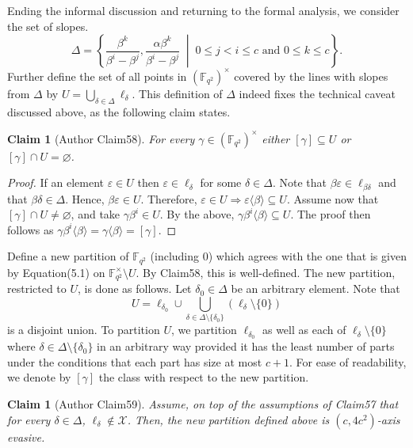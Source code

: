 \documentclass[10pt,a4paper]{article}
\newtheorem{ntclaim}[nttheorem]{Claim}
\begin{document}
Ending the informal discussion and returning to the formal analysis, we consider the set of slopes.
\begin{equation}\Delta=\left\{\frac{\beta^k}{\beta^i-\beta^j},\frac{\alpha\beta^k}{\beta^i-\beta^j}\;\middle|\;0\leq j<i\leq c\text{ and }0\leq k\leq c\right\}.\tag{5.4}\end{equation}
Further define the set of all points in $(\mathbb F_{q^2})^\times$ covered by the lines with slopes from $\Delta$ by $U=\bigcup_{\delta\in\Delta}\ell_\delta$. This definition of $\Delta$ indeed fixes the technical caveat discussed above, as the following claim states.
\begin{ntclaim}[Author Claim58]
For every $\gamma\in(\mathbb F_{q^2})^\times$ either $[\gamma]\subseteq U$ or $[\gamma]\cap U=\varnothing$.
\end{ntclaim}
\begin{proof}
If an element $\varepsilon\in U$ then $\varepsilon\in\ell_\delta$ for some $\delta\in\Delta$. Note that $\beta\varepsilon\in\ell_{\beta\delta}$ and that $\beta\delta\in\Delta$. Hence, $\beta\varepsilon\in U$. Therefore, $\varepsilon\in U\Longrightarrow\varepsilon\langle\beta\rangle\subseteq U$. Assume now that $[\gamma]\cap U\ne\varnothing$, and take $\gamma\beta^i\in U$. By the above, $\gamma\beta^i\langle\beta\rangle\subseteq U$. The proof then follows as $\gamma\beta^i\langle\beta\rangle=\gamma\langle\beta\rangle=[\gamma]$.
\end{proof}
Define a new partition of $\mathbb F_{q^2}$ (including $0$) which agrees with the one that is given by Equation(5.1) on $\mathbb F_{q^2}^\times\setminus U$. By Claim58, this is well-defined. The new partition, restricted to $U$, is done as follows. Let $\delta_0\in\Delta$ be an arbitrary element. Note that
\[U=\ell_{\delta_0}\cup\bigcup_{\delta\in\Delta\setminus\{\delta_0\}}(\ell_\delta\setminus\{0\})\]
is a disjoint union. To partition $U$, we partition $\ell_{\delta_0}$ as well as each of $\ell_\delta\setminus\{0\}$ where $\delta\in\Delta\setminus\{\delta_0\}$ in an arbitrary way provided it has the least number of parts under the conditions that each part has size at most $c+1$. For ease of readability, we denote by $[\gamma]$ the class with respect to the new partition.
\begin{ntclaim}[Author Claim59]
Assume, on top of the assumptions of Claim57 that for every $\delta\in\Delta$, $\ell_\delta\notin\mathcal X$. Then, the new partition defined above is $(c,4c^2)$-axis evasive.
\end{ntclaim}
\end{document}
